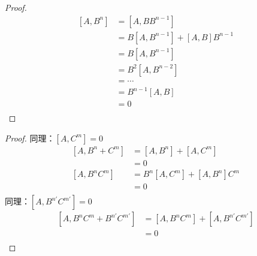 \begin{frame} [allowframebreaks=]
    \begin{proof}{}
        \begin{equation*}
            \begin{split} 
             [A,B^{n}]&=[A,BB^{n-1}] \\
             &=B[A,B^{n-1}]+[A,B]B^{n-1}\\
             &=B[A,B^{n-1}] \\
             &=B^2[A,B^{n-2}]\\
             &=\cdots\\
             &=B^{n-1}[A,B]\\
             &= 0\\
            \end{split}  
        \end{equation*}  
    \end{proof}
    \begin{proof}{}
        同理：$[A,C^{m}]=0$\\
        \begin{equation*}
            \begin{split} 
            [A,B^{n}+C^{m}] &= [A,B^{n}]+[A,C^{m}]\\
            &=0 \\
            [A,B^{n}C^{m}] &= B^{n}[A,C^{m}] + [A,B^{n}] C^{m}\\
            &=0 \\
        \end{split}  
        \end{equation*}
        同理：$[A,B^{n'}C^{m'}]=0$\\
        \begin{equation*}
            \begin{split} 
            [A,B^{n}C^{m}+B^{n'}C^{m'}] &= [A,B^{n}C^{m}]+[A,B^{n'}C^{m'}]\\
            &=0\\
        \end{split}  
        \end{equation*}
    \end{proof}
\end{frame} 

